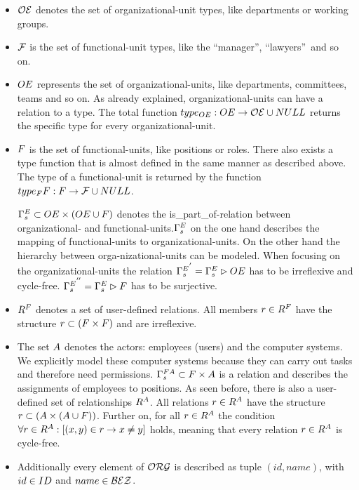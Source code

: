 	\begin{itemize}

	\item $\mathcal{OE}$ denotes the set of organizational-unit types, like departments or working groups.


	\item $\mathcal{F}$ is the set of functional-unit types, like the ``manager'', ``lawyers''\ and so on.


	\item $OE$ represents the set of organizational-units, like departments, committees, teams and so on. As already explained, organizational-units can have a relation to a type. The total function $type_{OE}: OE \rightarrow \mathcal{OE} \cup NULL$ returns the specific type for every organizational-unit.

	\item $F$ is the set of functional-units, like positions or roles. There also exists a type function that is almost defined in the same manner as described above. The type of a functional-unit is returned by the function $type_F{F}: F \rightarrow \mathcal{F} \cup NULL$.

	$\relstrukturOE_F \subset \oe \times (\oe \cup \f)$ denotes the is\_part\_of-relation between organizational- and functional-units.$\relstrukturOE_F$ on the one hand	describes the mapping of functional-units to organizational-units. On the	other hand the hierarchy between orga-nizational-units can be modeled. When focusing on the organizational-units the relation ${\relstrukturOE_F}^{'} = \relstrukturOE_F \rhd \oe$ has to be irreflexive and cycle-free. ${\relstrukturOE_F}^{''} = \relstrukturOE_F \rhd \f$ has to be surjective.

	\item  $R^{F}$ denotes a set of user-defined relations. All members $r \in R^{F}$ have the structure $r \subset (F \times F)$ and	are irreflexive.

	\item The set $A$ denotes the actors: employees (users) and the computer systems. We explicitly model these computer systems because they can carry out tasks and therefore need permissions. ${\Gamma}^{FA}_{s} \subset F \times A$ is a relation and describes the assignments of employees to positions. As seen before, there is also a user-defined set of relationships $R^{A}$. All relations $r \in R^{A}$ have the structure $r \subset (A \times (A \cup F))$. Further on, for all $r \in R^{A}$ the condition $\forall r \in R^{A}: \left[(x,y) \in r \rightarrow x \neq y \right]$ holds, meaning that every relation	$r \in R^{A}$ is cycle-free.

	\item Additionally every element of $\mathcal{ORG}$ is described as tuple $(id, name)$, with $id \in ID$ and $name \in \mathcal{BEZ}$.

	\end{itemize}

